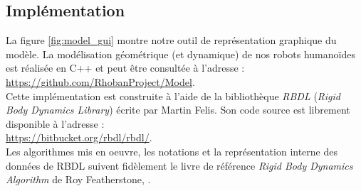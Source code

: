 \subsection{Implémentation\label{sec:model_geometric_rbdl}}

La figure \ref{fig:model_gui} montre notre outil de représentation 
graphique du modèle.
La modélisation géométrique (et dynamique) de nos robots 
humanoïdes est réalisée en C++ et peut être consultée à l'adresse :\\
\url{https://github.com/RhobanProject/Model}.\\

Cette implémentation est construite à l'aide de la bibliothèque 
\textit{RBDL} (\textit{Rigid Body Dynamics Library}) écrite par Martin Felis.
Son code source est librement disponible à l'adresse :\\
\url{https://bitbucket.org/rbdl/rbdl/}.\\

Les algorithmes mis en oeuvre, les notations et la représentation interne des données de RBDL 
suivent fidèlement le livre de référence \og \textit{Rigid Body Dynamics Algorithm} \fg
de Roy Featherstone, \cite{featherstone_rigid_2008}.

